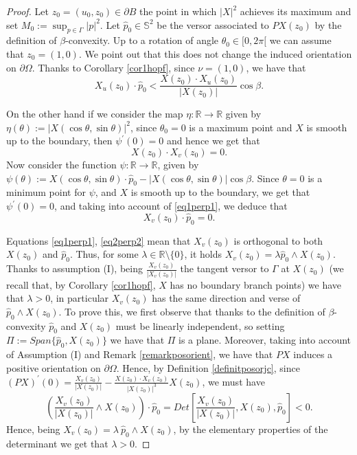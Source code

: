 \documentclass[a4paper,reqno,10pt,oneside]{amsart}
\numberwithin{equation}{section}
\begin{document}
\begin{proof} 
Let $z_0=(u_0,z_0) \in \partial B$ the point in which $|X|^2$ achieves its maximum and set $M_0:=\sup_{p \in \Gamma} |p|^2$. Let $\hat p_0 \in \mathbb{S}^2$ be the versor associated to $PX(z_0)$ by the definition of $\beta$-convexity. Up to a rotation of angle $\theta_0 \in [0,2\pi[$ we can assume that $z_0=(1,0)$. We point out that this does not change the induced orientation on $\partial \Omega$. Thanks to Corollary \ref{cor1hopf}, since $\nu=(1,0)$, we have that
\begin{equation}\label{eq1Hoplem}
X_u(z_0) \cdot \hat p_0 < \frac{X(z_0)\cdot X_u(z_0)}{|X(z_0)|}\cos \beta.
\end{equation}

On the other hand if we consider the map $\eta\colon{\mathbb R}\to{\mathbb R}$ given by $\eta(\theta):=|X(\cos \theta, \sin \theta)|^2$, since $\theta_0=0$ is a maximum point and $X$ is smooth up to the boundary, then $\psi^\prime(0)=0$ and hence we get that
\begin{equation}\label{eq1perp1}
 X(z_0) \cdot X_v(z_0) =0.
\end{equation}
Now consider the function $\psi\colon{\mathbb R}\to{\mathbb R}$, given by $\psi(\theta):=X(\cos \theta, \sin \theta)\cdot \hat p_0 - |X(\cos \theta, \sin \theta)| \cos \beta$. Since $\theta=0$ is a minimum point for $\psi$, and $X$ is smooth up to the boundary, we get that $\psi^\prime(0)=0$, and taking into account of \eqref{eq1perp1}, we deduce that
\begin{equation}\label{eq2perp2}
 X_v(z_0) \cdot \hat p_0=0.
\end{equation}

Equations \eqref{eq1perp1}, \eqref{eq2perp2} mean that $X_v(z_0)$ is orthogonal to both $X(z_0)$ and $\hat p_0$. Thus, for some $\lambda \in {\mathbb R}\setminus\{0\}$, it holds $X_v(z_0)=\lambda \hat p_0 \wedge X(z_0)$. Thanks to assumption (I), being $\frac{X_v(z_0)}{|X_v(z_0)|}$ the tangent versor to $\Gamma$ at $X(z_0)$ (we recall that, by Corollary \ref{cor1hopf}, $X$ has no boundary branch points) we have that $\lambda>0$, in particular $X_v(z_0)$  has the same direction and verse of $\hat p_0 \wedge X(z_0)$. To prove this, we first observe that thanks to the definition of $\beta$-convexity $\hat p_0$ and $X(z_0)$ must be linearly independent, so setting $\Pi:=Span \{\hat p_0, X(z_0)\}$ we have that $\Pi$ is a plane. Moreover, taking into account of Assumption (I) and Remark \ref{remarkposorient}, we have that $PX$ induces a positive orientation on $\partial \Omega$. Hence, by Definition \ref{definitposorjc}, since $(PX)^\prime(0)=\frac{X_v(z_0)}{|X(z_0)|}-\frac{X(z_0)\cdot X_v(z_0)}{|X(z_0)|^3}X(z_0)$, we must have 
$$\left(\frac{X_v(z_0)}{|X(z_0)|} \wedge X(z_0)\right) \cdot \hat p_0 =Det\left[\frac{X_v(z_0)}{|X(z_0)|}, X(z_0), \hat p_0\right]<0.$$
Hence, being $X_v(z_0)=\lambda\  \hat p_0 \wedge X(z_0)$, by the elementary properties of the determinant we get that $\lambda>0$.


\end{proof}
\end{document}
